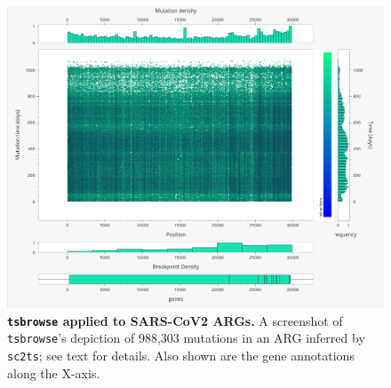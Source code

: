 \documentclass[unnumsec,webpdf,contemporary,large,namedate]{oup-authoring-template}%
\begin{document}
\begin{figure}
    \centering
    \includegraphics[width=0.95\linewidth]{manuscript/figures/SuppFig4.png}
    \caption{\textbf{\texttt{tsbrowse} applied to SARS-CoV2 ARGs.}
    A screenshot of \texttt{tsbrowse}'s depiction of 988,303 mutations in an 
    ARG inferred by \texttt{sc2ts}; see  text for details. Also shown are the 
    gene annotations along the X-axis.}
    \label{fig:Supplementary_Figure_4}
\end{figure}
\end{document}
